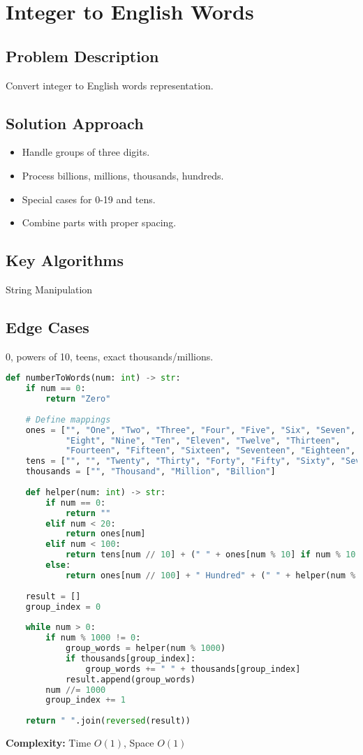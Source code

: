 \documentclass[10pt, a4paper]{article}
\begin{document}
\section{Integer to English Words}
\subsection*{Problem Description}
Convert integer to English words representation.

\subsection*{Solution Approach}
\begin{itemize}
    \item Handle groups of three digits.
    \item Process billions, millions, thousands, hundreds.
    \item Special cases for 0-19 and tens.
    \item Combine parts with proper spacing.
\end{itemize}

\subsection*{Key Algorithms}
String Manipulation

\subsection*{Edge Cases}
0, powers of 10, teens, exact thousands/millions.

\begin{lstlisting}[language=Python]
def numberToWords(num: int) -> str:
    if num == 0:
        return "Zero"
    
    # Define mappings
    ones = ["", "One", "Two", "Three", "Four", "Five", "Six", "Seven", 
            "Eight", "Nine", "Ten", "Eleven", "Twelve", "Thirteen", 
            "Fourteen", "Fifteen", "Sixteen", "Seventeen", "Eighteen", "Nineteen"]
    tens = ["", "", "Twenty", "Thirty", "Forty", "Fifty", "Sixty", "Seventy", "Eighty", "Ninety"]
    thousands = ["", "Thousand", "Million", "Billion"]
    
    def helper(num: int) -> str:
        if num == 0:
            return ""
        elif num < 20:
            return ones[num]
        elif num < 100:
            return tens[num // 10] + (" " + ones[num % 10] if num % 10 else "")
        else:
            return ones[num // 100] + " Hundred" + (" " + helper(num % 100) if num % 100 else "")
    
    result = []
    group_index = 0
    
    while num > 0:
        if num % 1000 != 0:
            group_words = helper(num % 1000)
            if thousands[group_index]:
                group_words += " " + thousands[group_index]
            result.append(group_words)
        num //= 1000
        group_index += 1
    
    return " ".join(reversed(result))
\end{lstlisting}
\textbf{Complexity:} Time $O(1)$, Space $O(1)$
\end{document}
